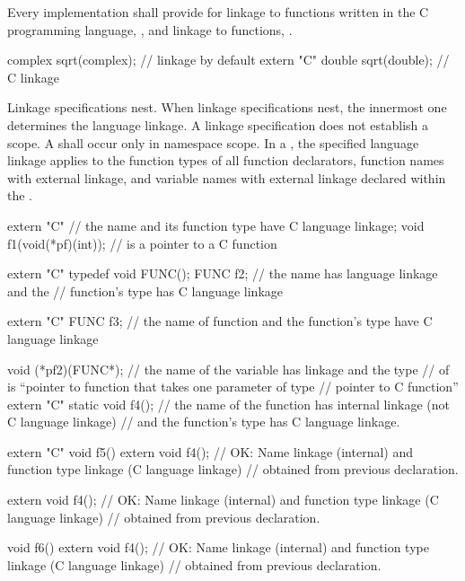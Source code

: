\pnum
{}%
Every implementation shall provide for linkage to functions written in
the C programming language,
%
, and linkage to \Cpp{} functions, .
\begin{example}
\begin{codeblock}
complex sqrt(complex);          // \Cpp{} linkage by default
extern "C" {
  double sqrt(double);          // C linkage
}
\end{codeblock}
\end{example}

\pnum
{}%
Linkage specifications nest. When linkage specifications nest, the
innermost one determines the language linkage. A linkage specification
does not establish a scope. A  shall
occur only in namespace scope. In a
, the specified language linkage applies
to the function types of all function declarators, function names with
external linkage, and variable names with external linkage declared
within the .
\begin{example}
\begin{codeblock}
extern "C"                      // the name  and its function type have C language linkage;
  void f1(void(*pf)(int));      //  is a pointer to a C function

extern "C" typedef void FUNC();
FUNC f2;                        // the name  has \Cpp{} language linkage and the
                                // function's type has C language linkage

extern "C" FUNC f3;             // the name of function  and the function's type have C language linkage

void (*pf2)(FUNC*);             // the name of the variable  has \Cpp{} linkage and the type
                                // of  is ``pointer to \Cpp{} function that takes one parameter of type
                                // pointer to C function''
extern "C" {
  static void f4();             // the name of the function  has internal linkage (not C language linkage)
                                // and the function's type has C language linkage.
}

extern "C" void f5() {
  extern void f4();             // OK: Name linkage (internal) and function type linkage (C language linkage)
                                // obtained from previous declaration.
}

extern void f4();               // OK: Name linkage (internal) and function type linkage (C language linkage)
                                // obtained from previous declaration.

void f6() {
  extern void f4();             // OK: Name linkage (internal) and function type linkage (C language linkage)
                                // obtained from previous declaration.
}
\end{codeblock}
\end{example}
